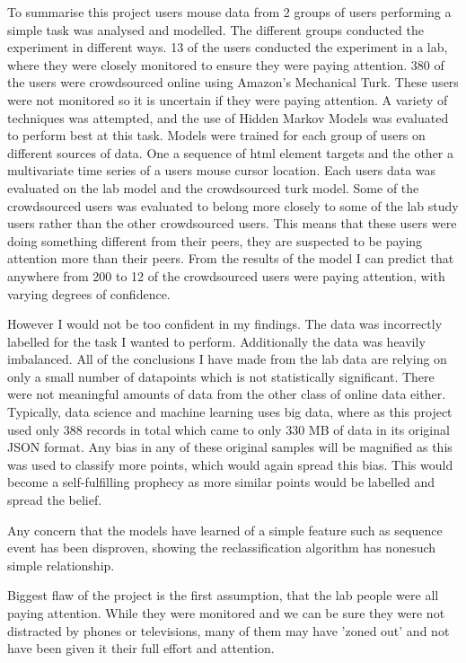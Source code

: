 \documentclass{article}
\begin{document}
To summarise this project users mouse data from 2 groups of users performing a simple task was analysed and modelled.
The different groups conducted the experiment in different ways.
13 of the users conducted the experiment in a lab, where they were closely monitored to ensure they were paying attention.
380 of the users were crowdsourced online using Amazon’s Mechanical Turk.
These users were not monitored so it is uncertain if they were paying attention.
A variety of techniques was attempted, and the use of Hidden Markov Models was evaluated to perform best at this task.
Models were trained for each group of users on different sources of data. 
One a sequence of html element targets and the other a multivariate time series of a users mouse cursor location.
Each users data was evaluated on the lab model and the crowdsourced turk model.
Some of the crowdsourced users was evaluated to belong more closely to some of the lab study users rather than the other crowdsourced users.
This means that these users were doing something different from their peers, they are suspected to be paying attention more than their peers. 
From the results of the model I can predict that anywhere from 200 to 12 of the crowdsourced users were paying attention, with varying degrees of confidence.

However I would not be too confident in my findings.
The data was incorrectly labelled for the task I wanted to perform.
Additionally the data was heavily imbalanced.
All of the conclusions I have made from the lab data are relying on only a small number of datapoints which is not statistically significant.
There were not meaningful amounts of data from the other class of online data either.
Typically, data science and machine learning uses big data, where as this project used only 388 records in total which came to only 330 MB of data in its original JSON format.
Any bias in any of these original samples will be magnified as this was used to classify more points, which would again spread this bias.
This would become a self-fulfilling prophecy as more similar points would be labelled and spread the belief.

Any concern that the models have learned of a simple feature such as sequence event has been disproven, showing the reclassification algorithm has nonesuch simple relationship.

Biggest flaw of the project is the first assumption, that the lab people were all paying attention.
While they were monitored and we can be sure they were not distracted by phones or televisions, many of them may have 'zoned out' and not have been given it their full effort and attention.
\end{document}
